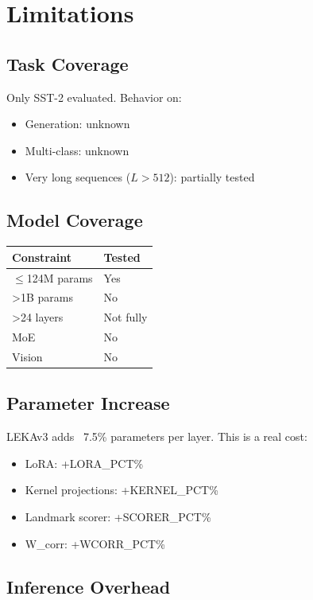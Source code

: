 \section{Limitations}

\subsection{Task Coverage}

Only SST-2 evaluated. Behavior on:
\begin{itemize}
\item Generation: unknown
\item Multi-class: unknown
\item Very long sequences ($L > 512$): partially tested

\end{itemize}
\subsection{Model Coverage}

\begin{table}[H]
\centering
\small
\begin{tabular}{ll}
\toprule
\textbf{Constraint} & \textbf{Tested} \\
\midrule
$\le$124M params & Yes \\
>1B params & No \\
>24 layers & Not fully \\
MoE & No \\
Vision & No \\
\bottomrule
\end{tabular}
\end{table}

\subsection{Parameter Increase}

LEKAv3 adds ~7.5\% parameters per layer. This is a real cost:
\begin{itemize}
\item LoRA: +{{LORA\_PCT}}\%
\item Kernel projections: +{{KERNEL\_PCT}}\%
\item Landmark scorer: +{{SCORER\_PCT}}\%
\item W\_corr: +{{WCORR\_PCT}}\%

\end{itemize}
\subsection{Inference Overhead}

